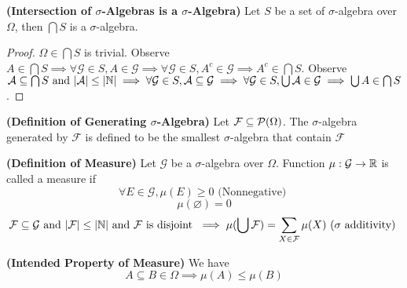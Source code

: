 \documentclass{report}
\begin{document}
\begin{lemma}
\label{1.1.3}
\textbf{(Intersection of $\sigma$-Algebras is a $\sigma$-Algebra)} Let $S$ be a set of $\sigma$-algebra over $\Omega$, then $\bigcap S$ is a $\sigma$-algebra. 
\end{lemma}
\begin{proof}
  $\Omega\in \bigcap S$ is trivial. Observe $A\in \bigcap S\implies  \forall \mathcal{G}\in S, A\in \mathcal{G}\implies \forall \mathcal{G}\in S, A^c\in \mathcal{G}\implies A^c \in\bigcap S$. Observe $\mathcal{A}\subseteq \bigcap S\text{ and }|\mathcal{A}|\leq |\mathbb{N}|\implies \forall\mathcal{G}\in S, \mathcal{A}\subseteq \mathcal{G}\implies \forall \mathcal{G}\in S, \bigcup \mathcal{A} \in\mathcal{G}\implies \bigcup A\in \bigcap S$.
\end{proof}
\begin{definition}
\label{1.1.4}
\textbf{(Definition of Generating $\sigma$-Algebra)} Let $\mathcal{F}\subseteq \mathcal{P}(\Omega)$. The $\sigma$-algebra generated by $\mathcal{F}$ is defined to be the smallest  $\sigma$-algebra that contain $\mathcal{F}$
\end{definition}
\begin{definition}
\label{1.1.5}
  \textbf{(Definition of Measure)} Let $\mathcal{G}$ be a $\sigma$-algebra over $\Omega$. Function $\mu:\mathcal{G}\rightarrow \mathbb{R}$ is called a measure if
\begin{equation}
\forall E\in \mathcal{G}, \mu(E)\geq 0\text{ (Nonnegative) }
\end{equation}  
\begin{equation}
\mu(\varnothing)=0
\end{equation}
\begin{equation}
\mathcal{F}\subseteq \mathcal{G}\text{ and }|\mathcal{F}|\leq |\mathbb{N}|\text{ and }\mathcal{F}\text{ is disjoint }\implies \mu(\bigcup  \mathcal{F})=\sum_{X\in \mathcal{F}} \mu(X)\text{ ($\sigma$ additivity) }
\end{equation}
\end{definition}
\begin{theorem}
\label{1.1.6}
\textbf{(Intended Property of Measure)} We have
\begin{equation}
A\subseteq B\in \Omega\implies \mu(A)\leq  \mu(B)
\end{equation}
\end{theorem}
\end{document}
